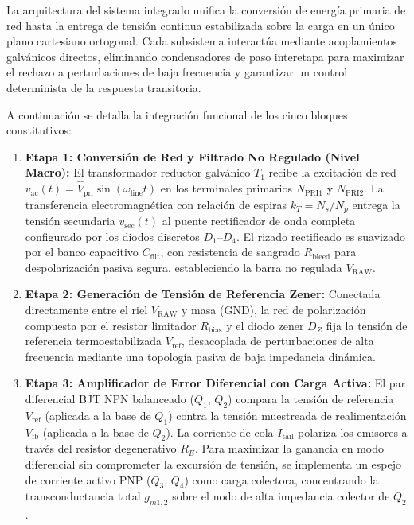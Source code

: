 La arquitectura del sistema integrado unifica la conversión de energía primaria de red hasta la entrega de tensión continua estabilizada sobre la carga en un único plano cartesiano ortogonal. Cada subsistema interactúa mediante acoplamientos galvánicos directos, eliminando condensadores de paso interetapa para maximizar el rechazo a perturbaciones de baja frecuencia y garantizar un control determinista de la respuesta transitoria.

A continuación se detalla la integración funcional de los cinco bloques constitutivos:

\begin{enumerate}
    \item \textbf{Etapa 1: Conversión de Red y Filtrado No Regulado (Nivel Macro):}
    El transformador reductor galvánico $T_1$ recibe la excitación de red $v_{\mathrm{ac}}(t) = \hat{V}_{\mathrm{pri}} \sin(\omega_{\mathrm{line}} t)$ en los terminales primarios $N_{\mathrm{PRI1}}$ y $N_{\mathrm{PRI2}}$. La transferencia electromagnética con relación de espiras $k_T = N_s/N_p$ entrega la tensión secundaria $v_{\mathrm{sec}}(t)$ al puente rectificador de onda completa configurado por los diodos discretos $D_1$--$D_4$. El rizado rectificado es suavizado por el banco capacitivo $C_{\mathrm{filt}}$, con resistencia de sangrado $R_{\mathrm{bleed}}$ para despolarización pasiva segura, estableciendo la barra no regulada $V_{\mathrm{RAW}}$.

    \item \textbf{Etapa 2: Generación de Tensión de Referencia Zener:}
    Conectada directamente entre el riel $V_{\mathrm{RAW}}$ y masa ($\mathrm{GND}$), la red de polarización compuesta por el resistor limitador $R_{\mathrm{bias}}$ y el diodo zener $D_Z$ fija la tensión de referencia termoestabilizada $V_{\mathrm{ref}}$, desacoplada de perturbaciones de alta frecuencia mediante una topología pasiva de baja impedancia dinámica.

    \item \textbf{Etapa 3: Amplificador de Error Diferencial con Carga Activa:}
    El par diferencial BJT NPN balanceado ($Q_1$, $Q_2$) compara la tensión de referencia $V_{\mathrm{ref}}$ (aplicada a la base de $Q_1$) contra la tensión muestreada de realimentación $V_{\mathrm{fb}}$ (aplicada a la base de $Q_2$). La corriente de cola $I_{\mathrm{tail}}$ polariza los emisores a través del resistor degenerativo $R_E$. Para maximizar la ganancia en modo diferencial sin comprometer la excursión de tensión, se implementa un espejo de corriente activo PNP ($Q_3$, $Q_4$) como carga colectora, concentrando la transconductancia total $g_{m1,2}$ sobre el nodo de alta impedancia colector de $Q_2$.


\end{enumerate}
